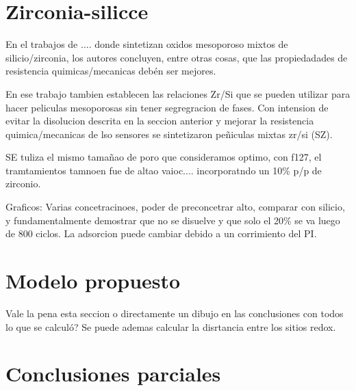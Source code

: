 	\section{Zirconia-silicce}

		En el trabajos de .... donde sintetizan oxidos mesoporoso mixtos de silicio/zirconia, los autores concluyen, entre otras cosas, que las propiedadades de resistencia quimicas/mecanicas debén ser mejores. 

		En ese trabajo tambien establecen las relaciones Zr/Si que se pueden utilizar para hacer peliculas mesoporosas sin tener segregracion de fases. Con intension de evitar la disolucion descrita en la seccion anterior y mejorar la resistencia quimica/mecanicas de lso sensores se sintetizaron peñiculas mixtas zr/si (SZ). 

		SE tuliza el mismo tamañao de poro que consideramos optimo, con f127, el tramtamientos tamnoen fue de altao vaioc.... incorporatndo un 10\% p/p de zirconio.


		Graficos: Varias concetracinoes, poder de preconcetrar alto, comparar con silicio, y fundamentalmente demostrar que no se disuelve y que solo el 20\% se va luego de 800 ciclos.
		La adsorcion puede cambiar debido a un corrimiento del PI.


\section{Modelo propuesto}

Vale la pena esta seccion o directamente un dibujo en las conclusiones con todos lo que se calculó? Se puede ademas calcular la disrtancia entre los sitios redox.

\section{Conclusiones parciales}



